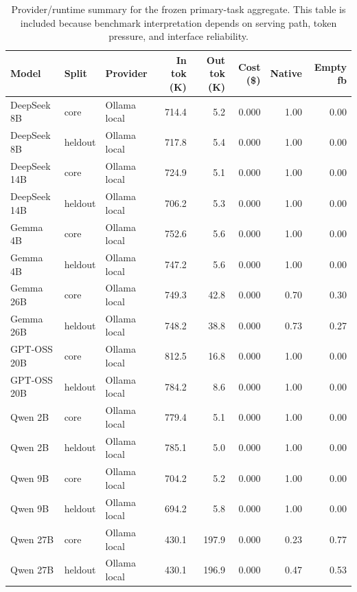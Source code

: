 \begin{table}[t]
  \centering
  \scriptsize
  \setlength{\tabcolsep}{4pt}
  \begin{tabular}{lllrrrrr}
    \toprule
    Model & Split & Provider & In tok (K) & Out tok (K) & Cost (\$) & Native & Empty fb \\
    \midrule
    DeepSeek 8B & core & Ollama local & 714.4 & 5.2 & 0.000 & 1.00 & 0.00 \\
    DeepSeek 8B & heldout & Ollama local & 717.8 & 5.4 & 0.000 & 1.00 & 0.00 \\
    DeepSeek 14B & core & Ollama local & 724.9 & 5.1 & 0.000 & 1.00 & 0.00 \\
    DeepSeek 14B & heldout & Ollama local & 706.2 & 5.3 & 0.000 & 1.00 & 0.00 \\
    Gemma 4B & core & Ollama local & 752.6 & 5.6 & 0.000 & 1.00 & 0.00 \\
    Gemma 4B & heldout & Ollama local & 747.2 & 5.6 & 0.000 & 1.00 & 0.00 \\
    Gemma 26B & core & Ollama local & 749.3 & 42.8 & 0.000 & 0.70 & 0.30 \\
    Gemma 26B & heldout & Ollama local & 748.2 & 38.8 & 0.000 & 0.73 & 0.27 \\
    GPT-OSS 20B & core & Ollama local & 812.5 & 16.8 & 0.000 & 1.00 & 0.00 \\
    GPT-OSS 20B & heldout & Ollama local & 784.2 & 8.6 & 0.000 & 1.00 & 0.00 \\
    Qwen 2B & core & Ollama local & 779.4 & 5.1 & 0.000 & 1.00 & 0.00 \\
    Qwen 2B & heldout & Ollama local & 785.1 & 5.0 & 0.000 & 1.00 & 0.00 \\
    Qwen 9B & core & Ollama local & 704.2 & 5.2 & 0.000 & 1.00 & 0.00 \\
    Qwen 9B & heldout & Ollama local & 694.2 & 5.8 & 0.000 & 1.00 & 0.00 \\
    Qwen 27B & core & Ollama local & 430.1 & 197.9 & 0.000 & 0.23 & 0.77 \\
    Qwen 27B & heldout & Ollama local & 430.1 & 196.9 & 0.000 & 0.47 & 0.53 \\
    \bottomrule
  \end{tabular}
  \caption{Provider/runtime summary for the frozen primary-task aggregate. This table is included because benchmark interpretation depends on serving path, token pressure, and interface reliability.}
  \label{tab:runtime}
\end{table}
